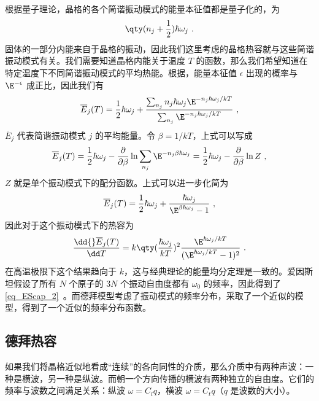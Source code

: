 

根据量子理论，晶格的各个简谐振动模式的能量本征值都是量子化的，为
\begin{equation}
\qty(n_j+\frac{1}{2})\hbar \omega_j~.
\end{equation}
固体的一部分内能来自于晶格的振动，因此我们这里考虑的晶格热容就与这些简谐振动模式有关。我们需要知道晶格内能关于温度 $T$ 的函数，那么我们希望知道在特定温度下不同简谐振动模式的平均热能。根据，能量本征值 $\epsilon$ 出现的概率与 $\E^{-\epsilon}$ 成正比，因此我们有
\begin{equation}
\overline E_j(T)=\frac{1}{2}\hbar \omega_j + \frac{\sum_{n_j} n_j\hbar \omega_j \E^{-n_j \hbar \omega_j / kT}}{\sum_{n_j} \E^{-n_j \hbar \omega_j / kT}}~,
\end{equation}
$\overline E_j$ 代表简谐振动模式 $j$ 的平均能量。令 $\beta=1/kT$，上式可以写成
\begin{equation}
\overline E_j(T)=\frac{1}{2}\hbar \omega_j - \frac{\partial}{\partial \beta} \ln \sum_{n_j} \E^{-n_j\beta\hbar\omega_j}=\frac{1}{2}\hbar \omega_j - \frac{\partial}{\partial \beta} \ln Z~,
\end{equation}
$Z$ 就是单个振动模式下的配分函数。上式可以进一步化简为
\begin{equation}
\overline E_j(T)=\frac{1}{2}\hbar \omega_j + \frac{\hbar \omega_j}{\E^{\beta\hbar\omega_j}-1}~,
\end{equation}
因此对于这个振动模式下的热容为
\begin{equation}
\frac{\dd{} \overline E_j(T)}{\dd T}=k \qty(\frac{\hbar\omega_j}{kT})^2\frac{\E^{\hbar \omega_j/kT}}{(\E^{\hbar\omega_j/kT}-1)^2}~.
\end{equation}
在高温极限下这个结果趋向于 $k$，这与经典理论的能量均分定理是一致的。爱因斯坦假设了所有 $N$ 个原子的 $3N$ 个振动自由度都有 $\omega_0$ 的频率，因此得到了\autoref{eq_EScap_2}~。而德拜模型考虑了振动模式的频率分布，采取了一个近似的模型，得到了一个近似的频率分布函数。

\subsection{德拜热容}
如果我们将晶格近似地看成“连续”的各向同性的介质，那么介质中有两种声波：一种是横波，另一种是纵波。而朝一个方向传播的横波有两种独立的自由度。它们的频率与波数之间满足关系：纵波 $\omega=C_l q$，横波 $\omega=C_t q$（$q$ 是波数的大小）。

